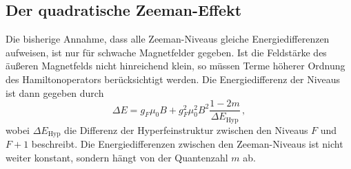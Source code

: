 \subsection{Der quadratische Zeeman-Effekt}
Die bisherige Annahme, dass alle Zeeman-Niveaus gleiche Energiedifferenzen aufweisen, ist nur für schwache Magnetfelder gegeben.
Ist die Feldstärke des äußeren Magnetfelds nicht hinreichend klein, so müssen Terme höherer Ordnung des Hamiltonoperators berücksichtigt werden.
Die Energiedifferenz der Niveaus ist dann gegeben durch
\begin{equation}
    \Delta E = g_F \mu_0 B + g_F^2 \mu_0^2 B^2 \frac{1-2m}{\Delta E_\text{Hyp}} \, ,
    \label{eqn:zeeman_2}
\end{equation}
wobei $\Delta E_\text{Hyp}$ die Differenz der Hyperfeinstruktur zwischen den Niveaus $F$ und $F+1$ beschreibt.
Die Energiedifferenzen zwischen den Zeeman-Niveaus ist nicht weiter konstant, sondern hängt von der Quantenzahl $m$ ab.

